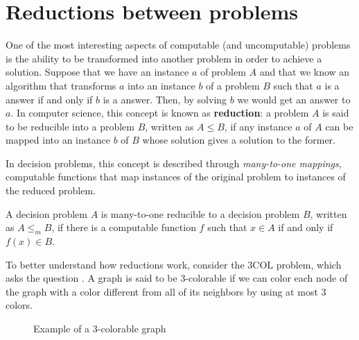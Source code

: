 \newpage

\section{Reductions between problems}

One of the most interesting aspects of computable (and uncomputable) problems is the ability to be transformed into another problem in order to achieve a solution. Suppose that we have an instance $a$ of problem $A$ and that we know an algorithm that transforms $a$ into an instance $b$ of a problem $B$ such that $a$ is a  answer if and only if $b$ is a  answer. Then, by solving $b$ we would get an answer to $a$. In computer science, this concept is known as \textbf{reduction}: a problem $A$ is said to be reducible into a problem $B$, written as $A \leq B$, if any instance $a$ of $A$ can be mapped into an instance $b$ of $B$ whose solution gives a solution to the former.

In decision problems, this concept is described through \textit{many-to-one mappings}, computable functions that map instances of the original problem to instances of the reduced problem.

\begin{definition}
 A decision problem $A$ is many-to-one reducible to a decision problem $B$, written as $A \leq_m B$, if there is a computable function $f$ such that $x \in A$ if and only if $f(x) \in B$. 
\end{definition}

To better understand how reductions work, consider the $3\mathrm{COL}$ problem, which asks the question . A graph is said to be 3-colorable if we can color each node of the graph with a color different from all of its neighbors by using at most 3 colors.

\begin{figure}[H]
    \centering
    
    
    \caption{Example of a 3-colorable graph}
\end{figure}

